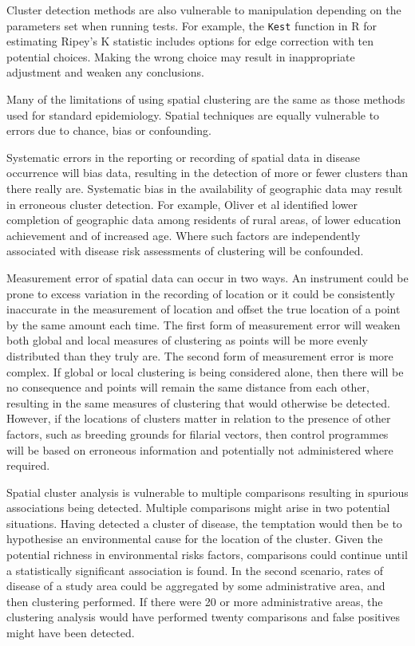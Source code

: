 \documentclass[a4paper,11pt]{article}
\begin{document}
Cluster detection methods are also vulnerable to manipulation depending on the parameters set when running tests.
For example, the \texttt{Kest} function in R for estimating Ripey's K statistic includes options for edge correction with ten potential choices. 
Making the wrong choice may result in inappropriate adjustment and weaken any conclusions. 

Many of the limitations of using spatial clustering are the same as those methods used for standard epidemiology. 
Spatial techniques are equally vulnerable to errors due to chance, bias or confounding. 

Systematic errors in the reporting or recording of spatial data in disease occurrence will bias data, resulting in the detection of more or fewer clusters than there really are. 
Systematic bias in the availability of geographic data may result in erroneous cluster detection. 
For example, Oliver et al identified lower completion of geographic data among residents of rural areas, of lower education achievement and of increased age. \cite{Oliver2005}
Where such factors are independently associated with disease risk assessments of clustering will be confounded. 

Measurement error of spatial data can occur in two ways. 
An instrument could be prone to excess variation in the recording of location or it could be consistently inaccurate in the measurement of location and offset the true location of a point by the same amount each time. 
The first form of measurement error will weaken both global and local measures of clustering as points will be more evenly distributed than they truly are. 
The second form of measurement error is more complex. 
If global or local clustering is being considered alone, then there will be no consequence and points will remain the same distance from each other, resulting in the same measures of clustering that would otherwise be detected.
However, if the locations of clusters matter in relation to the presence of other factors, such as breeding grounds for filarial vectors, then control programmes will be based on erroneous information and potentially not administered where required. 

Spatial cluster analysis is vulnerable to  multiple comparisons resulting in spurious associations being detected. \cite{Olsen1996}
Multiple comparisons might arise in two potential situations. 
Having detected a cluster of disease, the temptation would then be to hypothesise an environmental cause for the location of the cluster. 
Given the potential richness in environmental risks factors, comparisons could continue until a statistically significant association is found. 
In the second scenario, rates of disease of a study area could be aggregated by some administrative area, and then clustering performed. 
If there were 20 or more administrative areas, the clustering analysis would have performed twenty comparisons and false positives might have been detected. 
\end{document}
